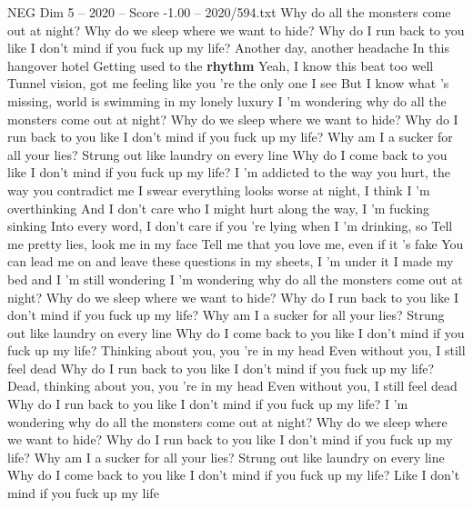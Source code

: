 \begin{textsample}{NEG Dim 5 – 2020 – Score -1.00 – 2020/594.txt}  \label{ex:f5_neg_024}
Why do all the monsters come out at night?
Why do we sleep where we want to hide?
Why do I run back to you like I don't mind if you fuck up my life?
Another day, another headache In this hangover hotel Getting used to the \textbf{rhythm} Yeah, I know this beat too well Tunnel vision, got me feeling like you 're the only one I see But I know what 's missing, world is swimming in my lonely luxury I 'm wondering why do all the monsters come out at night?
Why do we sleep where we want to hide?
Why do I run back to you like I don't mind if you fuck up my life?
Why am I a sucker for all your lies?
Strung out like laundry on every line Why do I come back to you like I don't mind if you fuck up my life?
I 'm addicted to the way you hurt, the way you contradict me I swear everything looks worse at night, I think I 'm overthinking And I don't care who I might hurt along the way, I 'm fucking sinking Into every word, I don't care if you 're lying when I 'm drinking, so Tell me pretty lies, look me in my face Tell me that you love me, even if it 's fake You can lead me on and leave these questions in my sheets, I 'm under it I made my bed and I 'm still wondering I 'm wondering why do all the monsters come out at night?
Why do we sleep where we want to hide?
Why do I run back to you like I don't mind if you fuck up my life?
Why am I a sucker for all your lies?
Strung out like laundry on every line Why do I come back to you like I don't mind if you fuck up my life?
Thinking about you, you 're in my head Even without you, I still feel dead Why do I run back to you like I don't mind if you fuck up my life?
Dead, thinking about you, you 're in my head Even without you, I still feel dead Why do I run back to you like I don't mind if you fuck up my life?
I 'm wondering why do all the monsters come out at night?
Why do we sleep where we want to hide?
Why do I run back to you like I don't mind if you fuck up my life?
Why am I a sucker for all your lies?
Strung out like laundry on every line Why do I come back to you like I don't mind if you fuck up my life?
Like I don't mind if you fuck up my life

\end{textsample}
